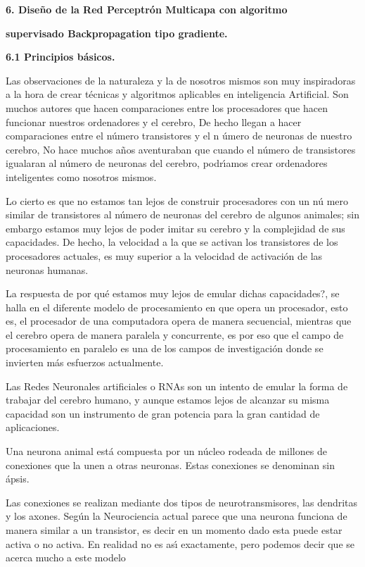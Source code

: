 \textbf{6. Dise\~{n}o de la Red Perceptr\'{o}n Multicapa con algoritmo }

\textbf{\qquad supervisado Backpropagation tipo gradiente.}

\textbf{6.1 Principios b\'{a}sicos.}

Las observaciones de la naturaleza y la de nosotros mismos son muy
inspiradoras a la hora de crear t\'{e}cnicas y algoritmos aplicables en
inteligencia Artificial. Son muchos autores que hacen comparaciones entre
los procesadores que hacen funcionar nuestros ordenadores y el cerebro, De
hecho llegan a hacer comparaciones entre el n\'{u}mero transistores y el n%
\'{u}mero de neuronas de nuestro cerebro, No hace muchos a\~{n}os
aventuraban que cuando el n\'{u}mero de transistores igualaran al n\'{u}mero
de neuronas del cerebro, podr\'{\i}amos crear ordenadores inteligentes como
nosotros mismos.

Lo cierto es que no estamos tan lejos de construir procesadores con un n\'{u}%
mero similar de transistores al n\'{u}mero de neuronas del cerebro de
algunos animales; sin embargo estamos muy lejos de poder imitar su cerebro y
la complejidad de sus capacidades. De hecho, la velocidad a la que se
activan los transistores de los procesadores actuales, es muy superior a la
velocidad de activaci\'{o}n de las neuronas humanas.

La respuesta de \textquestiondown por qu\'{e} estamos muy lejos de emular
dichas capacidades?, se halla en el diferente modelo de procesamiento en que
opera un procesador, esto es, el procesador de una computadora opera de
manera secuencial, mientras que el cerebro opera de manera paralela y
concurrente, es por eso que el campo de procesamiento en paralelo es una de
los campos de investigaci\'{o}n donde se invierten m\'{a}s esfuerzos
actualmente.

Las Redes Neuronales artificiales o RNAs son un intento de emular la forma
de trabajar del cerebro humano, y aunque estamos lejos de alcanzar su misma
capacidad son un instrumento de gran potencia para la gran cantidad de
aplicaciones.

Una neurona animal est\'{a} compuesta por un n\'{u}cleo rodeada de millones
de conexiones que la unen a otras neuronas. Estas conexiones se denominan sin%
\'{a}psis.

Las conexiones se realizan mediante dos tipos de neurotransmisores, las
dendritas y los axones. Seg\'{u}n la Neurociencia actual parece que una
neurona funciona de manera similar a un transistor, es decir en un momento
dado esta puede estar activa o no activa. En realidad no es as\'{\i}
exactamente, pero podemos decir que se acerca mucho a este modelo

